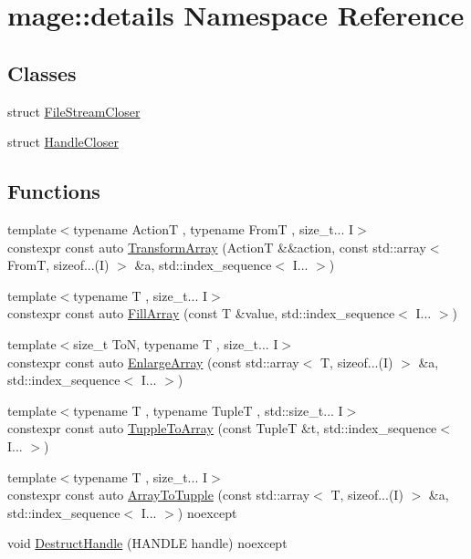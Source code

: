 \hypertarget{namespacemage_1_1details}{}\section{mage\+:\+:details Namespace Reference}
\label{namespacemage_1_1details}
\subsection*{Classes}
\begin{DoxyCompactItemize}
\item 
struct \mbox{\hyperlink{structmage_1_1details_1_1_file_stream_closer}{File\+Stream\+Closer}}
\item 
struct \mbox{\hyperlink{structmage_1_1details_1_1_handle_closer}{Handle\+Closer}}
\end{DoxyCompactItemize}
\subsection*{Functions}
\begin{DoxyCompactItemize}
\item 
{\footnotesize template$<$typename ActionT , typename FromT , size\+\_\+t... I$>$ }\\constexpr const auto \mbox{\hyperlink{namespacemage_1_1details_a597d1869ab9d86b34b67dc7d941dc5e5}{Transform\+Array}} (ActionT \&\&action, const std\+::array$<$ FromT, sizeof...(I) $>$ \&a, std\+::index\+\_\+sequence$<$ I... $>$)
\item 
{\footnotesize template$<$typename T , size\+\_\+t... I$>$ }\\constexpr const auto \mbox{\hyperlink{namespacemage_1_1details_ae5b148b74b882be8b1afd09832808a67}{Fill\+Array}} (const T \&value, std\+::index\+\_\+sequence$<$ I... $>$)
\item 
{\footnotesize template$<$size\+\_\+t ToN, typename T , size\+\_\+t... I$>$ }\\constexpr const auto \mbox{\hyperlink{namespacemage_1_1details_af8daa2a877610f68e45c4ac35c69dc06}{Enlarge\+Array}} (const std\+::array$<$ T, sizeof...(I) $>$ \&a, std\+::index\+\_\+sequence$<$ I... $>$)
\item 
{\footnotesize template$<$typename T , typename TupleT , std\+::size\+\_\+t... I$>$ }\\constexpr const auto \mbox{\hyperlink{namespacemage_1_1details_a32537621c79324893f0671ae2124a365}{Tupple\+To\+Array}} (const TupleT \&t, std\+::index\+\_\+sequence$<$ I... $>$)
\item 
{\footnotesize template$<$typename T , size\+\_\+t... I$>$ }\\constexpr const auto \mbox{\hyperlink{namespacemage_1_1details_a282e14de1d24b9f356912f8ac3bb868d}{Array\+To\+Tupple}} (const std\+::array$<$ T, sizeof...(I) $>$ \&a, std\+::index\+\_\+sequence$<$ I... $>$) noexcept
\item 
void \mbox{\hyperlink{namespacemage_1_1details_a213580128442b2980ad4c3c82bf80ee8}{Destruct\+Handle}} (H\+A\+N\+D\+LE handle) noexcept
\end{DoxyCompactItemize}



